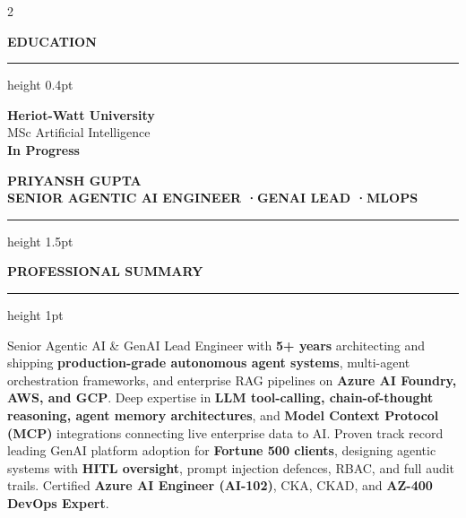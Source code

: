 \documentclass[10pt, a4paper]{article}
\newcommand{\sideHeading}[1]{%
  \vspace{8pt}%
  {\fontsize{6.5pt}{6.5pt}\selectfont
   \textcolor{accentPurple}{\bfseries\MakeUppercase{#1}}}%
  \vspace{3pt}%
  \textcolor{sideMuted}{\hrule height 0.4pt}%
  \vspace{5pt}%
}
\newcommand{\mainHeading}[1]{%
  \vspace{2pt}%
  {\fontsize{6.8pt}{6.8pt}\selectfont
   \textcolor{ruleLine}{\bfseries\MakeUppercase{#1}}}%
  \vspace{2pt}%
  \textcolor{ruleLine}{\hrule height 1pt}%
  \vspace{6pt}%
}
\begin{document}
\begin{paracol}{2}
\begin{minipage}[t][\paperheight][t]{\linewidth}
\begin{minipage}{\linewidth-10pt}
\sideHeading{Education}

{\fontsize{9pt}{9pt}\selectfont\bfseries\textcolor{sideLight}{Heriot-Watt University}}\\[2pt]
{\fontsize{8pt}{8pt}\selectfont\textcolor{sideText}{MSc Artificial Intelligence}}\\[2pt]
{\fontsize{8pt}{8pt}\selectfont\textcolor{accentPurple}{\bfseries In Progress}}

\end{minipage}
\end{minipage}

\switchcolumn

\vspace*{18pt}
\hspace*{10pt}%
\begin{minipage}{\linewidth-14pt}

{\fontsize{24pt}{24pt}\selectfont\bfseries\textcolor{mainDark}{PRIYANSH GUPTA}}\\[4pt]
{\fontsize{8pt}{8pt}\selectfont\bfseries\textcolor{ruleLine}{\MakeUppercase{%
  Senior Agentic AI Engineer \quad·\quad GenAI Lead \quad·\quad MLOps%
}}}\\[8pt]
{\color{ruleLine}\hrule height 1.5pt}

\vspace{12pt}

\mainHeading{Professional Summary}

{\fontsize{8.8pt}{14pt}\selectfont\textcolor{mainText}{%
  Senior Agentic AI \& GenAI Lead Engineer with \textbf{5+ years} architecting and shipping
  \textbf{production-grade autonomous agent systems}, multi-agent orchestration frameworks,
  and enterprise RAG pipelines on \textbf{Azure AI Foundry, AWS, and GCP}. Deep expertise in
  \textbf{LLM tool-calling, chain-of-thought reasoning, agent memory architectures}, and
  \textbf{Model Context Protocol (MCP)} integrations connecting live enterprise data to AI.
  Proven track record leading GenAI platform adoption for \textbf{Fortune 500 clients},
  designing agentic systems with \textbf{HITL oversight}, prompt injection defences, RBAC,
  and full audit trails. Certified \textbf{Azure AI Engineer (AI-102)}, CKA, CKAD, and
  \textbf{AZ-400 DevOps Expert}.
}}


\end{minipage}
\end{paracol}
\end{document}
